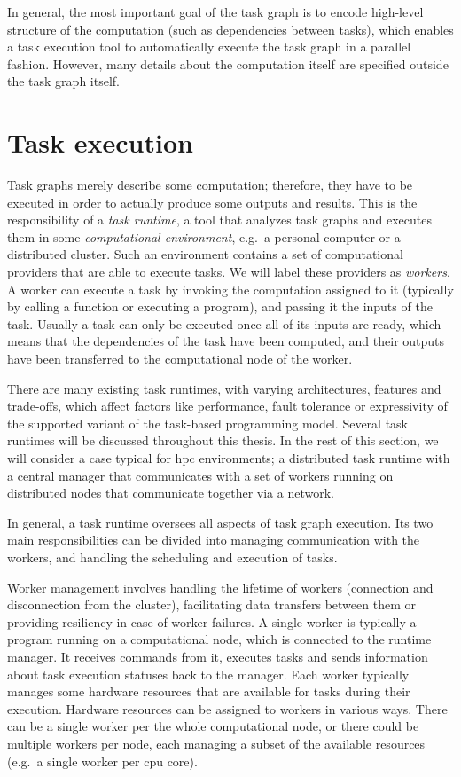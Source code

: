 In general, the most important goal of the task graph is to encode high-level structure of the
computation (such as dependencies between tasks), which enables a task execution tool to
automatically execute the task graph in a parallel fashion. However, many details about the
computation itself are specified outside the task graph itself.

\section{Task execution}
Task graphs merely describe some computation; therefore, they have to be executed in order to
actually produce some outputs and results. This is the responsibility of a \emph{task runtime},
a tool that analyzes task graphs and executes them in some \emph{computational environment}, e.g.\ a personal
computer or a distributed cluster. Such an environment contains a set of computational providers
that are able to execute tasks. We will label these providers as \emph{workers}. A worker
can execute a task by invoking the computation assigned to it (typically by calling a function or
executing a program), and passing it the inputs of the task. Usually a task can only be executed
once all of its inputs are ready, which means that the dependencies of the task have been computed,
and their outputs have been transferred to the computational node of the worker.

There are many existing task runtimes, with varying architectures, features and trade-offs, which
affect factors like performance, fault tolerance or expressivity of the supported variant of the
task-based programming model. Several task runtimes will be discussed throughout this thesis. In
the rest of this section, we will consider a case typical for \gls{hpc} environments;
a distributed task runtime with a central manager that communicates with a set of workers running
on distributed nodes that communicate together via a network.

In general, a task runtime oversees all aspects of task graph execution. Its two main
responsibilities can be divided into managing communication with the workers, and handling the
scheduling and execution of tasks.

Worker management involves handling the lifetime of workers (connection and disconnection from the
cluster), facilitating data transfers between them or providing resiliency in case of worker
failures. A single worker is typically a program running on a computational node, which is
connected to the runtime manager. It receives commands from it, executes tasks and sends
information about task execution statuses back to the manager. Each worker typically manages some
hardware resources that are available for tasks during their execution. Hardware resources can be
assigned to workers in various ways. There can be a single worker per the whole computational node,
or there could be multiple workers per node, each managing a subset of the available resources
(e.g.\ a single worker per \gls{cpu} core).


